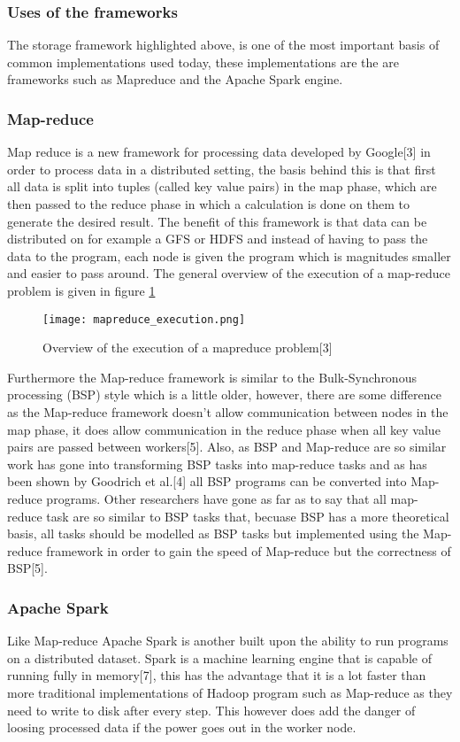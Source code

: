 \subsubsection{Uses of the frameworks}
The storage framework highlighted above, is one of the most important basis of common implementations used today,
these implementations are the are frameworks such as Mapreduce and the Apache Spark engine.

\subsubsection{Map-reduce}
Map reduce is a new framework for processing data developed by Google[3] in order
to process data in a distributed setting, the basis behind this is that first all
data is split into tuples (called key value pairs) in the map phase, which are then passed to the reduce
phase in which a calculation is done on them to generate the desired result. The
benefit of this framework is that data can be distributed on for example a GFS or HDFS
and instead of having to pass the data to the program, each node is given the program
which is magnitudes smaller and easier to pass around. The general overview of
the execution of a map-reduce problem is given in figure \ref{mapreduce_execution}

\begin{figure}
  \texttt{[image: mapreduce\_execution.png]}
  \caption{Overview of the execution of a mapreduce problem[3]}
  \label{mapreduce_execution}
\end{figure}

Furthermore the Map-reduce framework is similar to the Bulk-Synchronous processing (BSP)
style which is a little older, however, there are some difference as the Map-reduce
framework doesn't allow communication between nodes in the map phase, it does allow
communication in the reduce phase when all key value pairs are passed between workers[5].
Also, as BSP and Map-reduce are so similar work has gone into transforming BSP tasks into
map-reduce tasks and as has been shown by Goodrich et al.[4] all BSP programs can be
converted into Map-reduce programs. Other researchers have gone as far as to say
that all map-reduce task are so similar to BSP tasks that, becuase BSP has a more theoretical
basis, all tasks should be modelled as BSP tasks but implemented using the Map-reduce framework
in order to gain the speed of Map-reduce but the correctness of BSP[5].

\subsubsection{Apache Spark}
Like Map-reduce Apache Spark is another built upon the ability to run programs
on a distributed dataset. Spark is a machine learning engine that is capable of
running fully in memory[7], this has the advantage that it is a lot faster than
more traditional implementations of Hadoop program such as Map-reduce as they need
to write to disk after every step. This however does add the danger of loosing processed data
 if the power goes out in the worker node.

